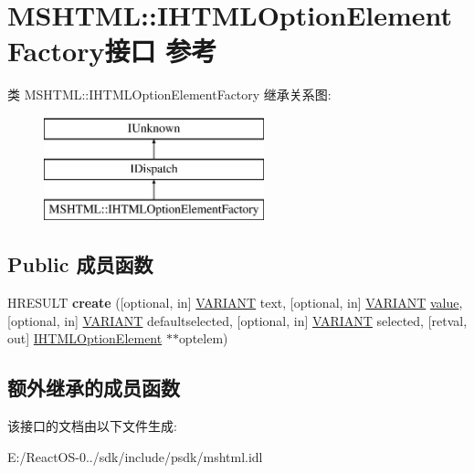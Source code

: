 \hypertarget{interface_m_s_h_t_m_l_1_1_i_h_t_m_l_option_element_factory}{}\section{M\+S\+H\+T\+ML\+:\+:I\+H\+T\+M\+L\+Option\+Element\+Factory接口 参考}
\label{interface_m_s_h_t_m_l_1_1_i_h_t_m_l_option_element_factory}
类 M\+S\+H\+T\+ML\+:\+:I\+H\+T\+M\+L\+Option\+Element\+Factory 继承关系图\+:\begin{figure}[H]
\begin{center}
\leavevmode
\includegraphics[height=3.000000cm]{interface_m_s_h_t_m_l_1_1_i_h_t_m_l_option_element_factory}
\end{center}
\end{figure}
\subsection*{Public 成员函数}
\begin{DoxyCompactItemize}
\item 
\mbox{\label{interface_m_s_h_t_m_l_1_1_i_h_t_m_l_option_element_factory_aa296c1e54d56b24c61918feb77db9628}} 
H\+R\+E\+S\+U\+LT {\bfseries create} (\mbox{[}optional, in\mbox{]} \hyperlink{structtag_v_a_r_i_a_n_t}{V\+A\+R\+I\+A\+NT} text, \mbox{[}optional, in\mbox{]} \hyperlink{structtag_v_a_r_i_a_n_t}{V\+A\+R\+I\+A\+NT} \hyperlink{unionvalue}{value}, \mbox{[}optional, in\mbox{]} \hyperlink{structtag_v_a_r_i_a_n_t}{V\+A\+R\+I\+A\+NT} defaultselected, \mbox{[}optional, in\mbox{]} \hyperlink{structtag_v_a_r_i_a_n_t}{V\+A\+R\+I\+A\+NT} selected, \mbox{[}retval, out\mbox{]} \hyperlink{interface_m_s_h_t_m_l_1_1_i_h_t_m_l_option_element}{I\+H\+T\+M\+L\+Option\+Element} $\ast$$\ast$optelem)
\end{DoxyCompactItemize}
\subsection*{额外继承的成员函数}


该接口的文档由以下文件生成\+:\begin{DoxyCompactItemize}
\item 
E\+:/\+React\+O\+S-\/0../sdk/include/psdk/mshtml.\+idl\end{DoxyCompactItemize}
